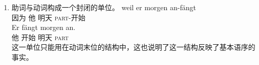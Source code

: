 \begin{enumerate}
\item 助词与动词构成一个封闭的单位。
\eal
\ex 
\gll weil er morgen an-fängt\\
     因为 他 明天 \textsc{part}-开始\\
\ex 
\gll Er fängt morgen an.\\
	 他 开始 明天 \textsc{part}\\
\zl
这一单位只能用在动词末位的结构中，这也说明了这一结构反映了基本语序的事实。


\end{enumerate}
